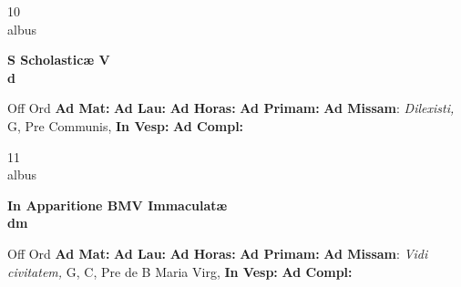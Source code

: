 \documentclass[10pt, openany]{book}
\begin{document}
    \begin{center}
        \begin{minipage}{3.5in}
            \vspace{2em}
            \begin{minipage}{0.5in}
                {\Huge 10} \\
                {\normalsize albus}
            \end{minipage}
            \begin{minipage}{3.0in}
                \textbf{ \large S Scholasticæ V \\
                \textnormal{\normalsize d}}

            \end{minipage}
            \begin{justify}Off Ord
                \textbf{Ad Mat: }
                \textbf{Ad Lau: }
                \textbf{Ad Horas: }
                \textbf{Ad Primam: }\textbf{Ad Missam}: \textit{Dilexisti,} G, Pre Communis, 
                \textbf{In Vesp: }
                \textbf{Ad Compl: }
            \end{justify}
        \end{minipage}
    \end{center}

    \begin{center}
        \begin{minipage}{3.5in}
            \vspace{2em}
            \begin{minipage}{0.5in}
                {\Huge 11} \\
                {\normalsize albus}
            \end{minipage}
            \begin{minipage}{3.0in}
                \textbf{ \large In Apparitione BMV Immaculatæ \\
                \textnormal{\normalsize dm}}

            \end{minipage}
            \begin{justify}Off Ord
                \textbf{Ad Mat: }
                \textbf{Ad Lau: }
                \textbf{Ad Horas: }
                \textbf{Ad Primam: }\textbf{Ad Missam}: \textit{Vidi civitatem,} G, C, Pre de B Maria Virg, 
                \textbf{In Vesp: }
                \textbf{Ad Compl: }
            \end{justify}
        \end{minipage}
    \end{center}
\end{document}
